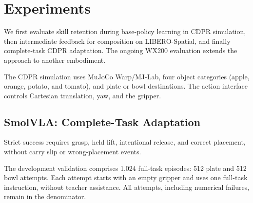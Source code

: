 \section{Experiments}\label{sec:experiments}
We first evaluate skill retention during base-policy learning in CDPR simulation, then intermediate feedback for composition on LIBERO-Spatial, and finally complete-task CDPR adaptation. The ongoing WX200 evaluation extends the approach to another embodiment.

The CDPR simulation uses MuJoCo Warp/MJ-Lab, four object categories (apple, orange, potato, and tomato), and plate or bowl destinations. The action interface controls Cartesian translation, yaw, and the gripper.






\subsection{SmolVLA: Complete-Task Adaptation}\label{sec:cdpr_results}
Strict success requires grasp, held lift, intentional release, and correct placement, without carry slip or wrong-placement events.

The development validation comprises 1,024 full-task episodes: 512 plate and 512 bowl attempts. Each attempt starts with an empty gripper and uses one full-task instruction, without teacher assistance. All attempts, including numerical failures, remain in the denominator.




